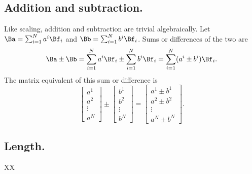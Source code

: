 \subsection{Addition and subtraction.}
Like scaling, addition and subtraction are trivial algebraically.  Let
\( \Ba = \sum_{i = 1}^N a^i \Bf_i \) and
\( \Bb = \sum_{i = 1}^N b^i \Bf_i \).  Sums or differences of the two are
\begin{dmath}\label{eqn:multivector:280}
\Ba \pm \Bb =
\sum_{i = 1}^N a^i \Bf_i
\pm
\sum_{i = 1}^N b^i \Bf_i
=
\sum_{i = 1}^N (a^i \pm b^i) \Bf_i.
\end{dmath}
The matrix equivalent of this sum or difference is
\begin{dmath}\label{eqn:multivector:300}
\begin{bmatrix}
a^1 \\
a^2 \\
\vdots \\
a^N
\end{bmatrix}
\pm
\begin{bmatrix}
b^1 \\
b^2 \\
\vdots \\
b^N
\end{bmatrix}
=
\begin{bmatrix}
a^1 \pm b^1 \\
a^2 \pm b^2 \\
\vdots \\
a^N \pm b^N
\end{bmatrix}.
\end{dmath}
\subsection{Length.}
XX
